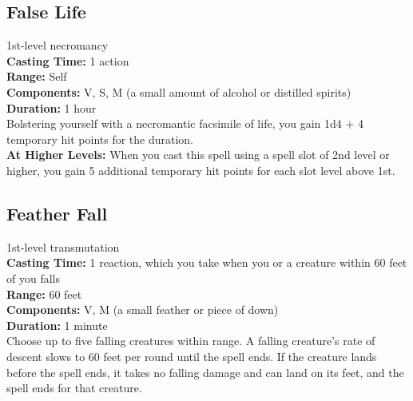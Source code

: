 \documentclass[11pt, A4paper, english]{article}
\begin{document}
		\subsection{False Life}
1st-level necromancy \\
\textbf{Casting Time:} 1 action \\
\textbf{Range:} Self \\
\textbf{Components:} V, S, M (a small amount of alcohol or distilled spirits) \\
\textbf{Duration:} 1 hour \\
Bolstering yourself with a necromantic facsimile of life, you gain 1d4 + 4 temporary hit points for the duration. \\
\textbf{At Higher Levels:} When you cast this spell using a spell slot of 2nd level or higher, you gain 5 additional temporary hit points for each slot level above  1st.

		\subsection{Feather Fall}
1st-level transmutation \\
\textbf{Casting Time:} 1 reaction, which you take when you or a creature within 60 feet of you falls \\
\textbf{Range:} 60 feet \\
\textbf{Components:} V, M (a small feather or piece of down) \\
\textbf{Duration:} 1 minute \\
Choose up to five falling creatures within range. A falling creature's rate of descent slows to 60 feet per round until the spell ends. If the creature lands before the spell ends, it takes no falling damage and can land on its feet, and the spell ends for that creature.
\end{document}
